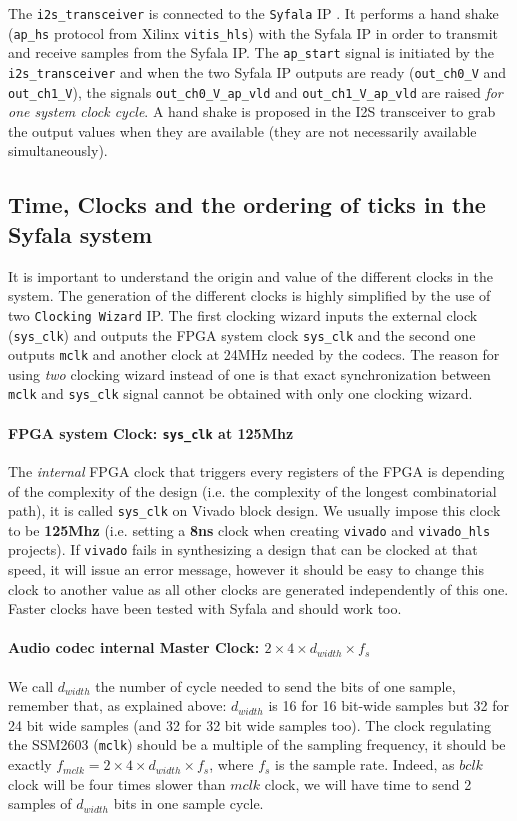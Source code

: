 \documentclass[11pt]{article}
\numberwithin{equation}{section}
\numberwithin{figure}{section}
\begin{document}
The {\tt i2s\_transceiver} is connected to the {\tt Syfala} IP . It performs a hand shake ({\tt ap\_hs} protocol from Xilinx {\tt vitis\_hls}) with the Syfala IP in order to transmit and receive samples from the Syfala IP. The {\tt ap\_start} signal is initiated by the {\tt i2s\_transceiver} and when the two Syfala IP outputs are ready ({\tt out\_ch0\_V} and {\tt out\_ch1\_V}), the signals {\tt out\_ch0\_V\_ap\_vld} and {\tt out\_ch1\_V\_ap\_vld} are raised {\em for one system clock cycle}. A hand shake is proposed in the I2S transceiver to grab the output values when they are available (they are not necessarily available simultaneously). 


\subsection{Time, Clocks and the ordering of ticks in the Syfala system}

It is important to understand the origin and value of the different clocks in the system. The generation of the different clocks is highly simplified by the use of two {\tt Clocking Wizard} IP. The first clocking wizard  inputs the  external clock ({\tt sys\_clk}) and outputs the FPGA system clock {\tt sys\_clk} and the second one outputs {\tt mclk} and another clock at 24MHz needed by the codecs. The reason for using {\em two} clocking wizard instead of one is that exact synchronization between {\tt mclk} and {\tt sys\_clk} signal cannot be obtained with only one clocking wizard.   

\paragraph{FPGA system Clock: {\tt sys\_clk} at 125Mhz}
The {\em internal} FPGA clock that triggers every registers of the FPGA is depending of the complexity of the design (i.e. the complexity of the longest combinatorial path), it is called {\tt sys\_clk} on Vivado block design. We usually impose this clock to be {\bf 125Mhz} (i.e. setting  a {\bf 8ns} clock when creating {\tt vivado} and {\tt vivado\_hls} projects). If {\tt vivado} fails in synthesizing a design that can be clocked at that speed, it will issue an error message, however it should be easy to change this clock to another value as all other clocks are generated independently of this one. Faster clocks have been tested with  Syfala and should work too.

\paragraph{Audio codec internal Master Clock: $ 2\times 4 \times d_{width}\times f_s$}
We call $d_{width}$ the number of cycle needed to send the bits of one sample,  remember that, as explained above: $d_{width}$ is 16 for 16 bit-wide samples but 32 for 24 bit wide samples (and 32 for 32 bit wide samples too).   
The clock regulating the SSM2603 ({\tt mclk}) should be a multiple of the sampling frequency, it should be exactly $f_{mclk}=2\times 4\times d_{width}\times f_s$, where $f_s$ is the sample rate. Indeed, as $bclk$ clock will be four times  slower than $mclk$ clock, we will have time to send 2 samples of $d_{width}$ bits in one sample cycle. 
\end{document}

